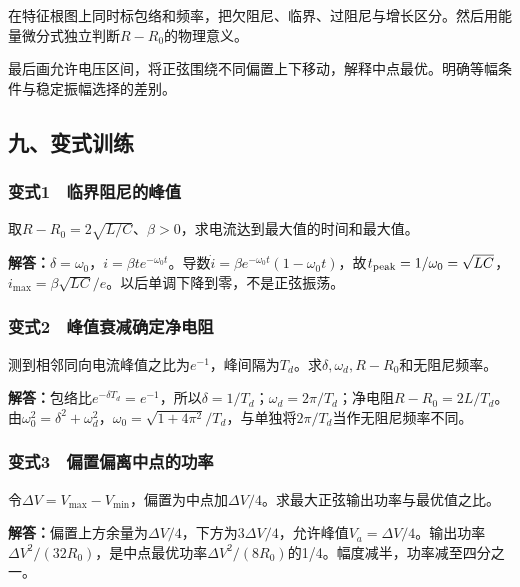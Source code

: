 \documentclass[12pt,a4paper,fontset=fandol]{ctexart}
\begin{document}
在特征根图上同时标包络和频率，把欠阻尼、临界、过阻尼与增长区分。然后用能量微分式独立判断\(R-R_0\)的物理意义。

最后画允许电压区间，将正弦围绕不同偏置上下移动，解释中点最优。明确等幅条件与稳定振幅选择的差别。

\subsection{九、变式训练}\label{ux4e5dux53d8ux5f0fux8badux7ec3-2}

\subsubsection{变式1　临界阻尼的峰值}\label{ux53d8ux5f0f1-ux4e34ux754cux963bux5c3cux7684ux5cf0ux503c}

取\(R-R_0=2\sqrt{L/C}\)、\(\beta>0\)，求电流达到最大值的时间和最大值。

\textbf{解答：}\(\delta=\omega_0\)，\(i=\beta t e^{-\omega_0t}\)。导数\(\dot i=\beta e^{-\omega_0t}(1-\omega_0t)\)，故\(t_{\rm peak}=1/\omega_0=\sqrt{LC}\)，\(i_{\max}=\beta\sqrt{LC}/e\)。以后单调下降到零，不是正弦振荡。

\subsubsection{变式2　峰值衰减确定净电阻}\label{ux53d8ux5f0f2-ux5cf0ux503cux8870ux51cfux786eux5b9aux51c0ux7535ux963b}

测到相邻同向电流峰值之比为\(e^{-1}\)，峰间隔为\(T_d\)。求\(\delta,\omega_d,R-R_0\)和无阻尼频率。

\textbf{解答：}包络比\(e^{-\delta T_d}=e^{-1}\)，所以\(\delta=1/T_d\)；\(\omega_d=2\pi/T_d\)；净电阻\(R-R_0=2L/T_d\)。由\(\omega_0^2=\delta^2+\omega_d^2\)，\(\omega_0=\sqrt{1+4\pi^2}/T_d\)，与单独将\(2\pi/T_d\)当作无阻尼频率不同。

\subsubsection{变式3　偏置偏离中点的功率}\label{ux53d8ux5f0f3-ux504fux7f6eux504fux79bbux4e2dux70b9ux7684ux529fux7387}

令\(\Delta V=V_{\max}-V_{\min}\)，偏置为中点加\(\Delta V/4\)。求最大正弦输出功率与最优值之比。

\textbf{解答：}偏置上方余量为\(\Delta V/4\)，下方为\(3\Delta V/4\)，允许峰值\(V_a=\Delta V/4\)。输出功率\(\Delta V^2/(32R_0)\)，是中点最优功率\(\Delta V^2/(8R_0)\)的1/4。幅度减半，功率减至四分之一。
\end{document}

